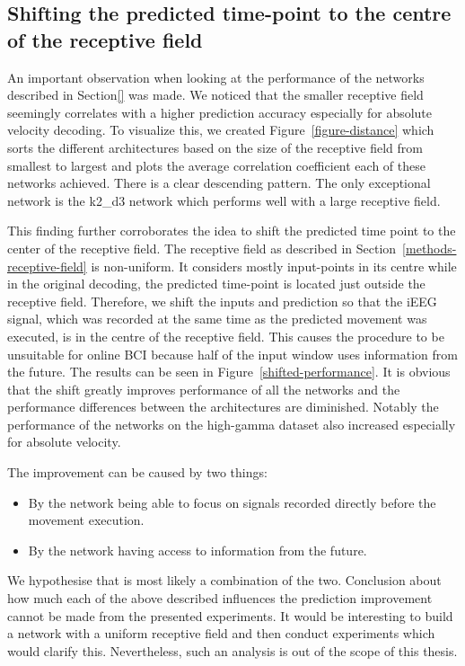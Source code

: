 \subsection{Shifting the predicted time-point to the centre of the receptive field}\label{subsec:shifting-the-predicted-time-point-to-the-centre-of-the-receptive-field}
An important observation when looking at the performance of the networks described in Section\ref{} was made.
We noticed that the smaller receptive field seemingly correlates with a higher prediction accuracy especially for absolute velocity decoding.
To visualize this, we created Figure~\ref{figure-distance} which sorts the different architectures based on the size of the receptive field from smallest to largest and plots the average correlation coefficient each of these networks achieved.
There is a clear descending pattern.
The only exceptional network is the k2\_d3 network which performs well with a large receptive field.

This finding further corroborates the idea to shift the predicted time point to the center of the receptive field.
The receptive field as described in Section~\ref{methods-receptive-field} is non-uniform.
It considers mostly input-points in its centre while in the original decoding, the predicted time-point is located just outside the receptive field.
Therefore, we shift the inputs and prediction so that the iEEG signal, which was recorded at the same time as the predicted movement was executed, is in the centre of the receptive field. This causes the procedure to be unsuitable for online BCI because half of the input window uses information from the future.
The results can be seen in Figure~\ref{shifted-performance}.
It is obvious that the shift greatly improves performance of all the networks and the performance differences between the architectures are diminished.
Notably the performance of the networks on the high-gamma dataset also increased especially for absolute velocity.

The improvement can be caused by two things:
\begin{itemize}
    \item By the network being able to focus on signals recorded directly before the movement execution.
    \item By the network having access to information from the future.
\end{itemize}

We hypothesise that is most likely a combination of the two.
Conclusion about how much each of the above described influences the prediction improvement cannot be made from the presented experiments.
It would be interesting to build a network with a uniform receptive field and then conduct experiments which would clarify this.
Nevertheless, such an analysis is out of the scope of this thesis.

